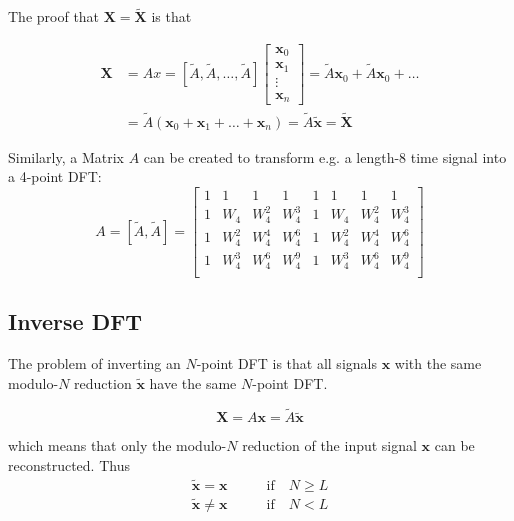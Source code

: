 The proof that $\mathbf{X} = \tilde{\mathbf{X}}$ is that

\begin{align*}
	\mathbf{X} &= Ax = [\tilde{A},\tilde{A},\ldots,\tilde{A}]
		\begin{bmatrix}
			\mathbf{x}_0 \\ \mathbf{x}_1 \\ \vdots \\ \mathbf{x}_n
		\end{bmatrix}
		= \tilde{A} \mathbf{x}_0 + \tilde{A} \mathbf{x}_0 + \ldots \\
	&= \tilde{A}(\mathbf{x}_0 + \mathbf{x}_1 + \ldots + \mathbf{x}_n) = \tilde{A}\tilde{\mathbf{x}} = \tilde{\mathbf{X}}
\end{align*}

Similarly, a Matrix $A$ can be created to transform e.g. a length-8 time signal
into a 4-point DFT:
\begin{equation*}
	A = \left[\tilde{A},\tilde{A}\right] = \left[ \begin{array}{cccc|cccc}
		1 & 1 & 1 & 1 & 1 & 1 & 1 & 1 \\
		1& W_4& W_4^2& W_4^3 & 1& W_4& W_4^2& W_4^3 \\
		1& W_4^2& W_4^4& W_4^6 & 1& W_4^2& W_4^4& W_4^6 \\
		1& W_4^3& W_4^6& W_4^9 & 1& W_4^3& W_4^6& W_4^9 \\
	\end{array} \right]
\end{equation*}

\subsection{Inverse DFT}
The problem of inverting an $N$-point DFT is that all signals $\mathbf{x}$
with the same modulo-$N$ reduction $\tilde{\mathbf{x}}$ have the same
$N$-point DFT.

\begin{equation*}
	\mathbf{X} = A \mathbf{x} = \tilde{A} \tilde{\mathbf{x}}
\end{equation*}

which means that only the modulo-$N$ reduction of the input signal $\mathbf{x}$
can be reconstructed. Thus
\begin{align*}
	\tilde{\mathbf{x}} = \mathbf{x} \qquad & \text{if} \quad N \geq L \\
	\tilde{\mathbf{x}} \neq \mathbf{x} \qquad & \text{if} \quad N < L
\end{align*}

